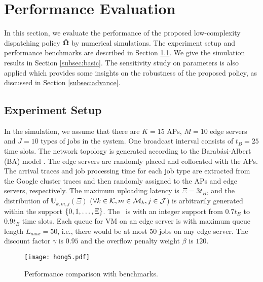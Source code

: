\section{Performance Evaluation}
\label{sec:evaluation}
In this section, we evaluate the performance of the proposed low-complexity dispatching policy $\tilde{\boldsymbol{\Omega}}$ by numerical simulations.
The experiment setup and performance benchmarks are described in Section \ref{subsec:setup}.
We give the simulation results in Section \ref{subsec:basic}.
The sensitivity study on parameters is also applied which provides some insights on the robustness of the proposed policy, as discussed in Section \ref{subsec:advance}.

\subsection{Experiment Setup}
\label{subsec:setup}
In the simulation, we assume that there are $K=15$ APs, $M=10$ edge servers and $J=10$ types of jobs in the system.
One broadcast interval consists of $t_{B}=25$ time slots.
The network topology is generated according to the Barab\'asi-Albert (BA) model \cite{albert1999diameter}.
The edge servers are randomly placed and collocated with the APs.
The arrival traces and job processing time for each job type are extracted from the Google cluster traces \cite{clusterdata:Reiss2011} and then randomly assigned to the APs and edge servers, respectively.
The maximum uploading latency is $\Xi = 3t_B$, and the distribution of $\mathbb{U}_{k,m,j}(\Xi)$ ($\forall k\in\mathcal{K}, m\in\mathcal{M}_{k}, j\in\mathcal{J}$) is arbitrarily generated within the support $\{0, 1, \dots, \Xi\}$.
The \brlatency~is with an integer support from $0.7t_B$ to $0.9t_B$ time slots.
Each queue for VM on an edge server is with maximum queue length $L_{max}=50$, i.e., there would be at most $50$ jobs on any edge server.
The discount factor $\gamma$ is $0.95$ and the overflow penalty weight $\beta$ is $120$.

\begin{figure}[ht]                                                      %
    \centering                                                          %
    \texttt{[image: hong5.pdf]}               %
    \caption{Performance comparison with benchmarks.}
    \label{fig:bar_plot}                                                %
\end{figure}                                                            %

